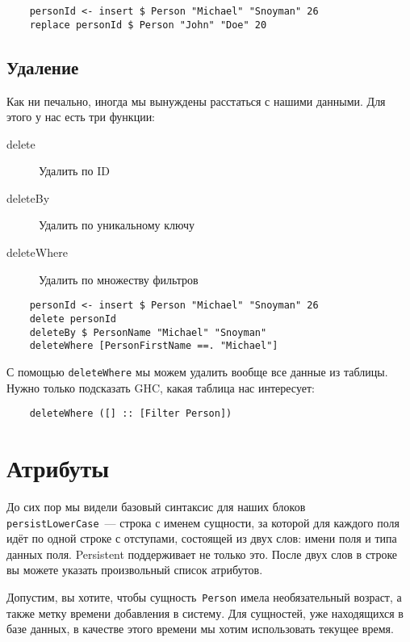 \begin{lstlisting}
    personId <- insert $ Person "Michael" "Snoyman" 26
    replace personId $ Person "John" "Doe" 20
\end{lstlisting}

\subsection{Удаление}

Как ни печально, иногда мы вынуждены расстаться с нашими данными. Для этого у
нас есть три функции:
\begin{description}
    \item[delete] Удалить по ID

    \item[deleteBy] Удалить по уникальному ключу

    \item[deleteWhere] Удалить по множеству фильтров
\end{description}

\begin{lstlisting}
    personId <- insert $ Person "Michael" "Snoyman" 26
    delete personId
    deleteBy $ PersonName "Michael" "Snoyman"
    deleteWhere [PersonFirstName ==. "Michael"]
\end{lstlisting}

С помощью \lstinline'deleteWhere' мы можем удалить вообще все данные из
таблицы. Нужно только подсказать GHC, какая таблица нас интересует:

\begin{lstlisting}
    deleteWhere ([] :: [Filter Person])
\end{lstlisting}

\section{Атрибуты}

До сих пор мы видели базовый синтаксис для наших блоков
\lstinline'persistLowerCase'~--- строка с именем сущности, за которой для
каждого поля идёт по одной строке с отступами, состоящей из двух слов: имени
поля и типа данных поля. Persistent поддерживает не только это. После двух слов
в строке вы можете указать произвольный список атрибутов.

Допустим, вы хотите, чтобы сущность~\lstinline'Person' имела необязательный
возраст, а также метку времени добавления в систему. Для сущностей, уже
находящихся в базе данных, в качестве этого времени мы хотим использовать
текущее время.

